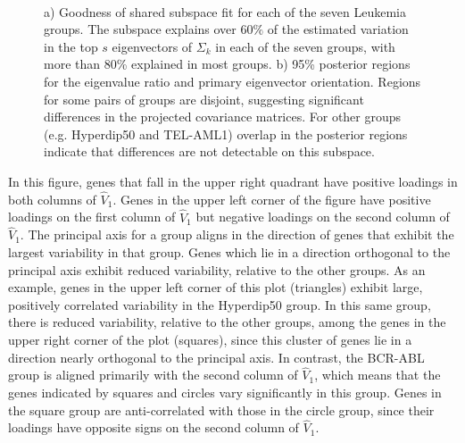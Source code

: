 \documentclass{statsoc}
\begin{document}
\begin{figure}[t]
    \centering
    ~ %
      \caption{a) Goodness of shared subspace fit for each of the
        seven Leukemia groups.  The subspace explains over $60\%$ of
        the estimated variation in the top $s$ eigenvectors of
        $\Sigma_k$ in each of the seven groups, with more than 80\%
        explained in most groups.  b) 95\% posterior regions for the
        eigenvalue ratio and primary eigenvector orientation.  Regions
        for some pairs of groups are disjoint, suggesting significant
        differences in the projected covariance matrices.  For other
        groups (e.g. Hyperdip50 and TEL-AML1) overlap in the posterior
        regions indicate that differences are not detectable on this
        subspace. }
\label{fig:leukemia}
\end{figure}

In this figure, genes that fall in the upper right quadrant have
positive loadings in both columns of $\hat{V}_1$. Genes in the upper left
corner of the figure have positive loadings on the first column of $\hat{V}_1$
but negative loadings on the second column of $\hat{V}_1$.  The principal axis
for a group aligns in the direction of genes that exhibit the largest
variability in that group.  Genes which lie in a direction orthogonal
to the principal axis exhibit reduced variability, relative to the
other groups. As an example, genes in the upper left corner of this
plot (triangles) exhibit large, positively correlated variability in
the Hyperdip50 group.  In this same group, there is reduced
variability, relative to the other groups, among the genes in the
upper right corner of the plot (squares), since this cluster of genes lie in
a direction nearly orthogonal to the principal axis.  In contrast, the
BCR-ABL group is aligned primarily with the second column of $\hat{V}_1$,
which means that the genes indicated by squares and circles vary
significantly in this group.  Genes in the square group are
anti-correlated with those in the circle group, since their
loadings have opposite signs on the second column of $\hat{V}_1$.
\end{document}
